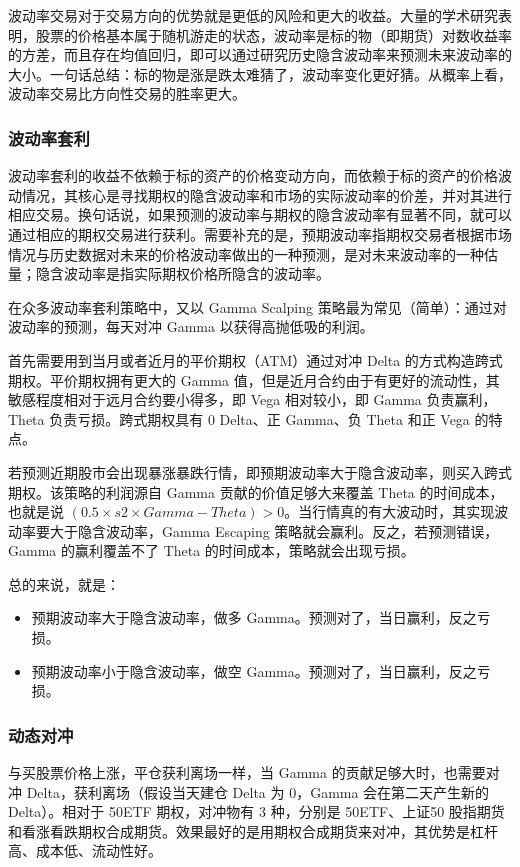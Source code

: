 波动率交易对于交易方向的优势就是更低的风险和更大的收益。大量的学术研究表明，股票的价格基本属于随机游走的状态，波动率是标的物（即期货）对数收益率的方差，而且存在均值回归，即可以通过研究历史隐含波动率来预测未来波动率的大小。一句话总结：标的物是涨是跌太难猜了，波动率变化更好猜。从概率上看，波动率交易比方向性交易的胜率更大。

\subsubsection*{波动率套利}
波动率套利的收益不依赖于标的资产的价格变动方向，而依赖于标的资产的价格波动情况，其核心是寻找期权的隐含波动率和市场的实际波动率的价差，并对其进行相应交易。换句话说，如果预测的波动率与期权的隐含波动率有显著不同，就可以通过相应的期权交易进行获利。需要补充的是，预期波动率指期权交易者根据市场情况与历史数据对未来的价格波动率做出的一种预测，是对未来波动率的一种估量；隐含波动率是指实际期权价格所隐含的波动率。

在众多波动率套利策略中，又以 Gamma Scalping 策略最为常见（简单）：通过对波动率的预测，每天对冲 Gamma 以获得高抛低吸的利润。

首先需要用到当月或者近月的平价期权（ATM）通过对冲 Delta 的方式构造跨式期权。平价期权拥有更大的 Gamma 值，但是近月合约由于有更好的流动性，其敏感程度相对于远月合约要小得多，即 Vega 相对较小，即 Gamma 负责赢利，Theta 负责亏损。跨式期权具有 0 Delta、正 Gamma、负 Theta 和正 Vega 的特点。

若预测近期股市会出现暴涨暴跌行情，即预期波动率大于隐含波动率，则买入跨式期权。该策略的利润源自 Gamma 贡献的价值足够大来覆盖 Theta 的时间成本，也就是说 $(0.5\times s2\times Gamma-Theta)>0$。当行情真的有大波动时，其实现波动率要大于隐含波动率，Gamma Escaping 策略就会赢利。反之，若预测错误，Gamma 的赢利覆盖不了 Theta 的时间成本，策略就会出现亏损。

总的来说，就是：
\begin{itemize}
    \item 预期波动率大于隐含波动率，做多 Gamma。预测对了，当日赢利，反之亏损。
    \item 预期波动率小于隐含波动率，做空 Gamma。预测对了，当日赢利，反之亏损。
\end{itemize}
\subsubsection{动态对冲}
与买股票价格上涨，平仓获利离场一样，当 Gamma 的贡献足够大时，也需要对冲 Delta，获利离场（假设当天建仓 Delta 为 0，Gamma 会在第二天产生新的 Delta）。相对于 50ETF 期权，对冲物有 3 种，分别是 50ETF、上证50 股指期货和看涨看跌期权合成期货。效果最好的是用期权合成期货来对冲，其优势是杠杆高、成本低、流动性好。

